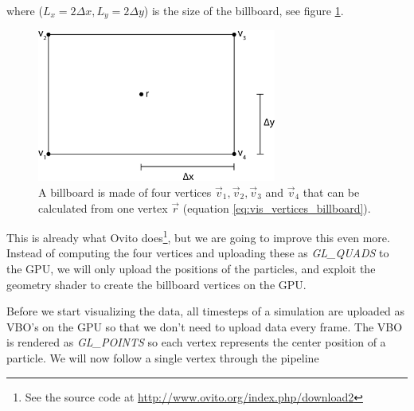 where ($L_x = 2\Delta x, L_y = 2\Delta y$) is the size of the billboard, see figure \ref{fig:visualization_billboard_vertices}.
\begin{figure}[h]
\begin{center}
\includegraphics[width=0.7\textwidth, trim=0cm 0cm 0cm 0cm, clip]{visualization/figures/billboard.eps}
\end{center}
\caption{A billboard is made of four vertices $\vec v_1, \vec v_2, \vec v_3$ and $\vec v_4$ that can be calculated from one vertex $\vec r$ (equation \eqref{eq:vis_vertices_billboard}).}
\label{fig:visualization_billboard_vertices}
\end{figure}
This is already what Ovito does\footnote{See the source code at \url{http://www.ovito.org/index.php/download2}}, but we are going to improve this even more. Instead of computing the four vertices and uploading these as \textit{GL\_QUADS} to the GPU, we will only upload the positions of the particles, and exploit the geometry shader to create the billboard vertices on the GPU.

Before we start visualizing the data, all timesteps of a simulation are uploaded as VBO's on the GPU so that we don't need to upload data every frame. The VBO is rendered as \textit{GL\_POINTS} so each vertex represents the center position of a particle. We will now follow a single vertex through the pipeline
